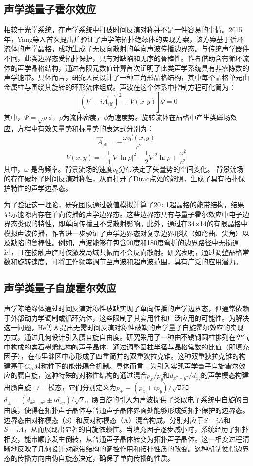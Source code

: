 \subsection{声学类量子霍尔效应}
相较于光学系统，在声学系统中打破时间反演对称并不是一件容易的事情。2015年，Yang等人首次提出并验证了声学陈拓扑绝缘体的实现方案\cite{i1}，该方案基于循环流体的声学晶格，成功生成了无反向散射的单向声波传播边界态。与传统声学器件不同，此类边界态受拓扑保护，具有对缺陷和无序的鲁棒性。作者借助含有循环流体的声学晶格结构，通过有限元数值计算首次证明了此类声学系统具有非零陈数的声学能带。具体而言，研究人员设计了一种三角形晶格结构，其中每个晶格单元由金属柱与围绕其旋转的环形流体组成。声波在这个体系中控制方程可化简为：
\[
    \left[ (\nabla - i \vec{A}_{\text{eff}})^2 + V(x, y) \right] \Psi = 0
    \]  
其中，$\Psi = \sqrt{\rho} \phi$，$\rho$为流体密度，$\phi$为速度势。旋转流体在晶格中产生类磁场效应，方程中有效矢量势和标量势的表达式分别为：  
\[
\vec{A}_{\text{eff}} = -\frac{\omega \vec{v_0}(x, y)}{c^2}
\]
\[
V(x, y) = -\frac{1}{4} \left|\nabla \ln \rho\right|^2 - \frac{1}{2} \nabla^2 \ln \rho + \frac{\omega^2}{c^2}
\]  
其中，\(\omega\) 是角频率。背景流场的速度$v_0$分布决定了矢量势的空间变化。
背景流场的存在破坏了时间反演对称性，从而打开了Dirac点处的能隙，生成了具有拓扑保护特性的声学边界态。

为了验证这一理论，研究团队通过数值模拟计算了20×1超晶格的能带结构，结果显示能隙内存在单向传播的声学边界态。这些边界态具有与量子霍尔效应中电子边界态类似的特性，即单向传播且不受散射影响。此外，通过在34×14的有限晶格中模拟声波传播，作者进一步验证了声学边界态对复杂边界形状（如弯曲、尖角）以及缺陷的鲁棒性。例如，声波能够在包含90度和180度弯折的边界路径中无损通过，且在接触声腔时仅激发局域共振而不会反向散射。研究表明，通过调整晶格常数和旋转速度，可将工作频率调节至声波和超声波范围，具有广泛的应用潜力。

\subsection{声学类量子自旋霍尔效应}

声学陈绝缘体通过时间反演对称性破缺实现了单向传播的声学边界态，但通常依赖于外部动力学调制或循环流体，这些限制了其实用性和广泛应用的可能性。为解决这一问题，He等人提出无需时间反演对称性破缺的声学量子自旋霍尔效应的实现方式，通过几何设计引入赝自旋自由度\cite{i2}。研究采用了一种由不锈钢圆柱排列在空气中构成的类石墨烯结构的声子晶体，通过调整圆柱半径与晶格常数的比值（即填充因子），在布里渊区中心形成了四重简并的双重狄拉克锥。这种双重狄拉克锥的构建基于$C_{6v}$对称性下的能带耦合机制。具体而言，为引入实现声学量子自旋霍尔效应的赝自旋，这种特殊的对称性结构的通过混合$p_x/p_y$和$d_{x^2-y^2}/d_{xy}$的声学模态构建出赝自旋$+/-$模态，它们分别定义为$p_{\pm} = (p_x\pm ip_y)/\sqrt{2}$和$d_{\pm} = (d_{x^2-y^2}\pm id_{xy})/\sqrt{2}$。赝自旋的引入为声波提供了类似电子系统中自旋的自由度，使得在拓扑声子晶体与普通声子晶体界面处能够形成受拓扑保护的边界态。边界态由对称模态（S）和反对称模态（A）混合构成，分别对应于$S+iA$和$S-iA$，从而展现出显著的自旋依赖性。当填充因子逐步减小时，系统经历了拓扑相变，能带顺序发生倒转，从普通声子晶体转变为拓扑声子晶体。这一相变过程清晰地反映了几何设计对能带结构的调控作用和拓扑性质的改变。这种机制使得边界态的传播方向由伪自旋态决定，确保了单向传播的性质。

